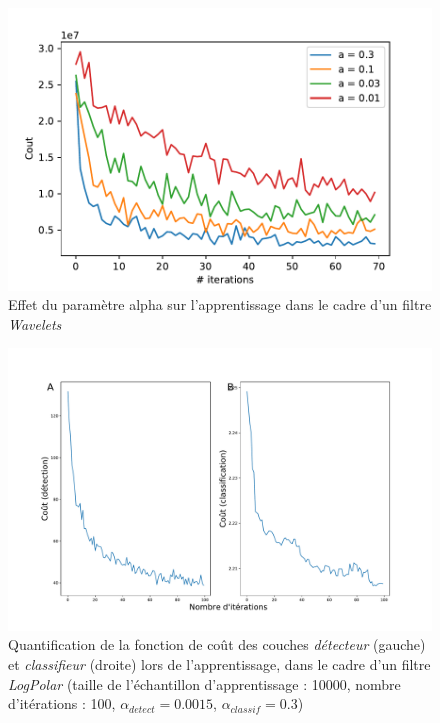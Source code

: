 \begin{figure}[th]
\centering
\includegraphics{Figures/Benchmarking_para_alpha}
\decoRule
\caption[Figure]{Effet du paramètre alpha sur l'apprentissage dans le cadre d'un filtre \textit{Wavelets}}
\label{fig:benchmark_alpha}
\end{figure}

\begin{figure}[th]
\centering
\includegraphics[scale=0.4]{Figures/logpolar_cost_learning}
\decoRule
\caption[Figure]{Quantification de la fonction de coût des couches \textit{détecteur} (gauche) et \textit{classifieur} (droite) lors de l'apprentissage, dans le cadre d'un filtre \textit{LogPolar} (taille de l'échantillon d'apprentissage :  10000, nombre d'itérations : 100, $\alpha_{detect}=0.0015$, $\alpha_{classif}=0.3$)}
\label{fig:logpolar_cost}
\end{figure}

